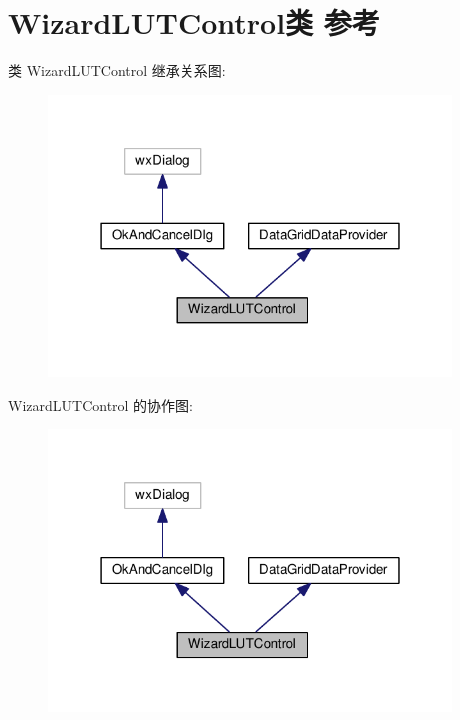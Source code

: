 \hypertarget{class_wizard_l_u_t_control}{\section{Wizard\+L\+U\+T\+Control类 参考}
\label{class_wizard_l_u_t_control}
}


类 Wizard\+L\+U\+T\+Control 继承关系图\+:
\nopagebreak
\begin{figure}[H]
\begin{center}
\leavevmode
\includegraphics[width=303pt]{class_wizard_l_u_t_control__inherit__graph}
\end{center}
\end{figure}


Wizard\+L\+U\+T\+Control 的协作图\+:
\nopagebreak
\begin{figure}[H]
\begin{center}
\leavevmode
\includegraphics[width=303pt]{class_wizard_l_u_t_control__coll__graph}
\end{center}
\end{figure}
